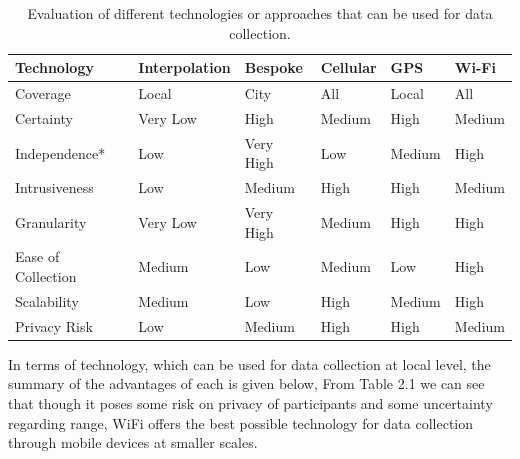 \begin{table}
  \footnotesize
  \begin{center}
    \begin{tabular}{p{2.25cm}p{1.5cm}p{1.3cm}p{1.3cm}p{1.3cm}p{1.3cm}}
      \toprule
        Technology & Interpolation & Bespoke & Cellular & GPS & Wi-Fi \\
      \midrule
        Coverage & Local & City & All & Local & All\\
        \addlinespace[0.2cm]
        Certainty & Very Low & High & Medium & High & Medium \\
        \addlinespace[0.2cm]
        Independence* & Low & Very High & Low & Medium & High \\
        \addlinespace[0.2cm]
        Intrusiveness & Low & Medium & High & High & Medium \\
        \addlinespace[0.2cm]
        Granularity & Very Low & Very High & Medium & High & High \\
        \addlinespace[0.2cm]
        Ease of Collection & Medium & Low & Medium & Low & High \\
        \addlinespace[0.2cm]
        Scalability & Medium & Low & High & Medium & High \\
        \addlinespace[0.2cm]
        Privacy Risk & Low & Medium & High & High & Medium \\
      \bottomrule
    \end{tabular}
  \end{center}
  \caption{Evaluation of different technologies or approaches that can be used for data collection.}
  \label{test}
\end{table}

In terms of technology, which can be used for data collection at local level, the summary of the advantages of each is given below,
From Table 2.1 we can see that though it poses some risk on privacy of participants and some uncertainty regarding range, WiFi offers the best possible technology for data collection through mobile devices at smaller scales.
